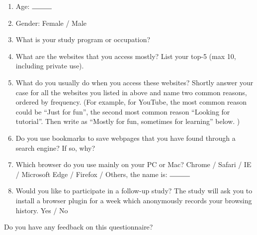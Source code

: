 \begin{enumerate}
    \item Age: $\rule{1cm}{0.15mm}$
    \item Gender: Female / Male
    \item What is your study program or occupation? 
    \item What are the websites that you access mostly? List your top-5 (max 10, including private use).
    \item What do you usually do  when you access these websites? Shortly answer your case for all the websites you listed in above and name  two common reasons, ordered by frequency.
    (For example, for YouTube, the most common reason could be ``Just for fun'', the second most common reason ``Looking for tutorial''. Then write as ``Mostly for fun, sometimes for learning'' below. )
    \item Do you use bookmarks to save webpages that you have found through a search engine? If so, why? 
    \item Which browser do you use mainly on your PC or Mac? 
          Chrome / Safari / IE / Microsoft Edge / Firefox / Others, the name is: $\rule{1cm}{0.15mm}$
    \item Would you like to participate in a follow-up study? The study will ask you to install a browser plugin for a week which anonymously records your browsing history. 
          Yes / No
\end{enumerate}
% 

%


% 


% 


% 








 Do you have any feedback on this questionnaire?